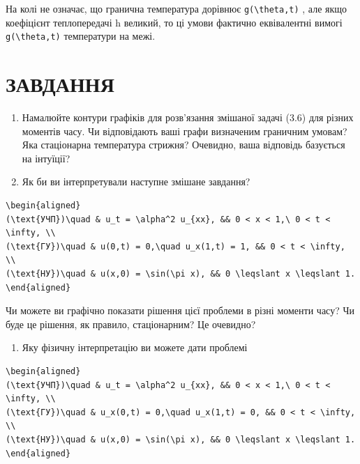 \documentclass[
  ukrainian,
]{article}
\providecommand{\tightlist}{%
  \setlength{\itemsep}{0pt}\setlength{\parskip}{0pt}}
\begin{document}
На колі не означає, що гранична температура дорівнює
\texttt{g(\textbackslash{}theta,t)} , але якщо коефіцієнт теплопередачі
h великий, то ці умови фактично еквівалентні вимогі
\texttt{g(\textbackslash{}theta,t)} температури на межі.

\section{ЗАВДАННЯ}\label{ux437ux430ux432ux434ux430ux43dux43dux44f}

\begin{enumerate}
\def\labelenumi{\arabic{enumi}.}
\item
  Намалюйте контури графіків для розв'язання змішаної задачі (3.6) для
  різних моментів часу. Чи відповідають ваші графи визначеним граничним
  умовам? Яка стаціонарна температура стрижня? Очевидно, ваша відповідь
  базується на інтуїції?
\item
  Як би ви інтерпретували наступне змішане завдання?
\end{enumerate}

\begin{verbatim}
\begin{aligned}
(\text{УЧП})\quad & u_t = \alpha^2 u_{xx}, && 0 < x < 1,\ 0 < t < \infty, \\
(\text{ГУ})\quad & u(0,t) = 0,\quad u_x(1,t) = 1, && 0 < t < \infty, \\
(\text{НУ})\quad & u(x,0) = \sin(\pi x), && 0 \leqslant x \leqslant 1.
\end{aligned}
\end{verbatim}

Чи можете ви графічно показати рішення цієї проблеми в різні моменти
часу? Чи буде це рішення, як правило, стаціонарним? Це очевидно?

\begin{enumerate}
\def\labelenumi{\arabic{enumi}.}
\setcounter{enumi}{2}
\tightlist
\item
  Яку фізичну інтерпретацію ви можете дати проблемі
\end{enumerate}

\begin{verbatim}
\begin{aligned}
(\text{УЧП})\quad & u_t = \alpha^2 u_{xx}, && 0 < x < 1,\ 0 < t < \infty, \\
(\text{ГУ})\quad & u_x(0,t) = 0,\quad u_x(1,t) = 0, && 0 < t < \infty, \\
(\text{НУ})\quad & u(x,0) = \sin(\pi x), && 0 \leqslant x \leqslant 1.
\end{aligned}
\end{verbatim}
\end{document}
